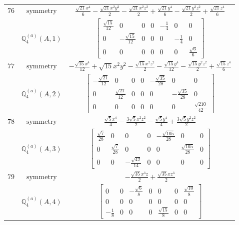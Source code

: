 \documentclass[fleqn,8pt,landscape]{jsarticle}
\begin{document}
\begin{longtable}{ccc}
$ 76 $ & $ \text{symmetry} $ & $ \frac{\sqrt{21} x^{4}}{6} - \frac{\sqrt{21} x^{2} y^{2}}{2} - \frac{\sqrt{21} x^{2} z^{2}}{2} + \frac{\sqrt{21} y^{4}}{6} - \frac{\sqrt{21} y^{2} z^{2}}{2} + \frac{\sqrt{21} z^{4}}{6} $ \\
$  $ & $ \mathbb{Q}_{4}^{(a)}(A,1) $ & $ \begin{bmatrix} \frac{\sqrt{15}}{12} & 0 & 0 & 0 & - \frac{1}{4} & 0 & 0 \\ 0 & - \frac{\sqrt{15}}{12} & 0 & 0 & 0 & - \frac{1}{4} & 0 \\ 0 & 0 & 0 & 0 & 0 & 0 & \frac{\sqrt{6}}{6} \end{bmatrix} $ \\ \hline
$ 77 $ & $ \text{symmetry} $ & $ - \frac{\sqrt{15} x^{4}}{12} + \sqrt{15} x^{2} y^{2} - \frac{\sqrt{15} x^{2} z^{2}}{2} - \frac{\sqrt{15} y^{4}}{12} - \frac{\sqrt{15} y^{2} z^{2}}{2} + \frac{\sqrt{15} z^{4}}{6} $ \\
$  $ & $ \mathbb{Q}_{4}^{(a)}(A,2) $ & $ \begin{bmatrix} - \frac{\sqrt{21}}{12} & 0 & 0 & 0 & - \frac{\sqrt{35}}{28} & 0 & 0 \\ 0 & \frac{\sqrt{21}}{12} & 0 & 0 & 0 & - \frac{\sqrt{35}}{28} & 0 \\ 0 & 0 & 0 & 0 & 0 & 0 & \frac{\sqrt{210}}{42} \end{bmatrix} $ \\ \hline
$ 78 $ & $ \text{symmetry} $ & $ \frac{\sqrt{5} x^{4}}{4} - \frac{3 \sqrt{5} x^{2} z^{2}}{2} - \frac{\sqrt{5} y^{4}}{4} + \frac{3 \sqrt{5} y^{2} z^{2}}{2} $ \\
$  $ & $ \mathbb{Q}_{4}^{(a)}(A,3) $ & $ \begin{bmatrix} \frac{\sqrt{7}}{28} & 0 & 0 & 0 & - \frac{\sqrt{105}}{28} & 0 & 0 \\ 0 & \frac{\sqrt{7}}{28} & 0 & 0 & 0 & \frac{\sqrt{105}}{28} & 0 \\ 0 & 0 & - \frac{\sqrt{42}}{14} & 0 & 0 & 0 & 0 \end{bmatrix} $ \\ \hline
$ 79 $ & $ \text{symmetry} $ & $ - \frac{\sqrt{35} x^{3} z}{2} + \frac{\sqrt{35} x z^{3}}{2} $ \\
$  $ & $ \mathbb{Q}_{4}^{(a)}(A,4) $ & $ \begin{bmatrix} 0 & 0 & - \frac{\sqrt{6}}{8} & 0 & 0 & 0 & \frac{\sqrt{10}}{8} \\ 0 & 0 & 0 & 0 & 0 & 0 & 0 \\ - \frac{1}{8} & 0 & 0 & 0 & \frac{\sqrt{15}}{8} & 0 & 0 \end{bmatrix} $ \\ \hline

\end{longtable}
\end{document}
